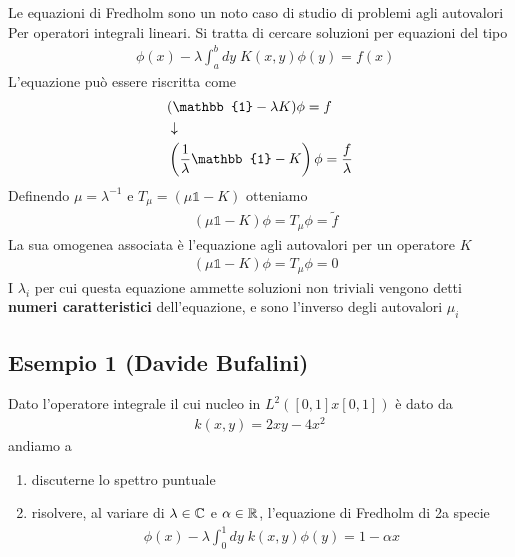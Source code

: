 Le equazioni di Fredholm sono un noto caso di studio di problemi agli autovalori Per operatori integrali lineari. Si tratta di cercare soluzioni per equazioni del tipo
\begin{align}
	&\phi(x) - \lambda \int_{a}^{b} dy \; K(x,y) \phi(y) = f(x) 
\end{align}
L'equazione può essere riscritta come
\begin{align}
	&(\mathbb{1} - \lambda K)\phi=f \nextpassage
	&\left(\frac{1}{\lambda}\mathbb{1} - K \right)\phi=\frac{f}{\lambda}
\end{align}
Definendo $\mu = \lambda^{-1}$ e $T_\mu = (\mu \mathbb{1} - K)$ otteniamo 
\begin{align}
	&\left(\mu\mathbb{1} - K \right)\phi= T_\mu \phi = \tilde{f}
\end{align}
La sua omogenea associata è l'equazione agli autovalori per un operatore $K$
\begin{align}
	&\left(\mu\mathbb{1} - K \right)\phi= T_\mu \phi = 0
\end{align}
I $\lambda_i$ per cui questa equazione ammette soluzioni non triviali vengono detti \textbf{numeri caratteristici} dell'equazione, e sono l'inverso degli autovalori $\mu_i$

\newpage



\subsection{Esempio 1 (Davide Bufalini)}

Dato l'operatore integrale il cui nucleo in $L^2([0,1]x[0,1])$ è dato da
\begin{align}
	k(x,y) = 2xy-4x^2 \label{nucleo}
\end{align}
andiamo a
\begin{enumerate}
	\item discuterne lo spettro puntuale
	\item risolvere, al variare di $\lambda \in \mathbb{C}$ e $\alpha \in \mathbb{R}$, l'equazione di Fredholm di 2a specie
	\begin{align}
		\phi(x) -\lambda \int_{0}^{1} dy \; k(x,y) \phi(y) = 1 -\alpha x
	\end{align} 
\end{enumerate}

